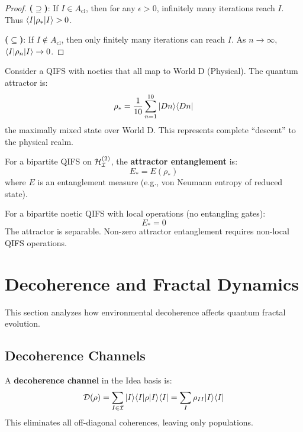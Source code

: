 \begin{proof}
\textbf{($\supseteq$)}: If $I \in A_{\mathrm{cl}}$, then for any $\epsilon > 0$, infinitely many iterations reach $I$. Thus $\langle I|\rho_*|I\rangle > 0$.

\textbf{($\subseteq$)}: If $I \notin A_{\mathrm{cl}}$, then only finitely many iterations can reach $I$. As $n \to \infty$, $\langle I|\rho_n|I\rangle \to 0$.
\end{proof}

\begin{example}
\label{ex:world-attractor}
Consider a QIFS with noetics that all map to World D (Physical). The quantum attractor is:
\[
\rho_* = \frac{1}{10}\sum_{n=1}^{10} |Dn\rangle\langle Dn|
\]
the maximally mixed state over World D. This represents complete ``descent'' to the physical realm.
\end{example}

\begin{definition}
\label{def:attractor-entanglement}
For a bipartite QIFS on $\mathcal{H}_{\mathcal{I}}^{(2)}$, the \textbf{attractor entanglement} is:
\[
E_* = E(\rho_*)
\]
where $E$ is an entanglement measure (e.g., von Neumann entropy of reduced state).
\end{definition}

\begin{theorem}
\label{thm:attractor-entanglement}
For a bipartite noetic QIFS with local operations (no entangling gates):
\[
E_* = 0
\]
The attractor is separable. Non-zero attractor entanglement requires non-local QIFS operations.
\end{theorem}

\section{Decoherence and Fractal Dynamics}
\label{sec:decoherence-fractals}

This section analyzes how environmental decoherence affects quantum fractal evolution.

\subsection{Decoherence Channels}

\begin{definition}
\label{def:decoherence-channel}
A \textbf{decoherence channel} in the Idea basis is:
\[
\mathcal{D}(\rho) = \sum_{I \in \mathcal{I}} |I\rangle\langle I| \rho |I\rangle\langle I| = \sum_I \rho_{II} |I\rangle\langle I|
\]
This eliminates all off-diagonal coherences, leaving only populations.
\end{definition}

